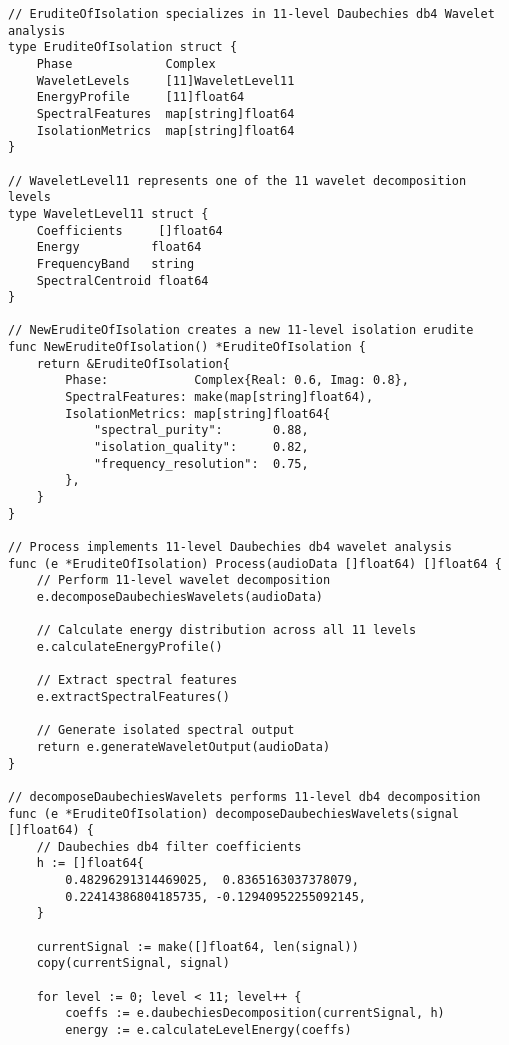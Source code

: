 \begin{tcolorbox}[colback=CodeBackground, colframe=DarkGray, title=Erudite of Isolation Implementation, fonttitle=\bfseries]
\begin{verbatim}
// EruditeOfIsolation specializes in 11-level Daubechies db4 Wavelet analysis
type EruditeOfIsolation struct {
    Phase             Complex
    WaveletLevels     [11]WaveletLevel11
    EnergyProfile     [11]float64
    SpectralFeatures  map[string]float64
    IsolationMetrics  map[string]float64
}

// WaveletLevel11 represents one of the 11 wavelet decomposition levels
type WaveletLevel11 struct {
    Coefficients     []float64
    Energy          float64
    FrequencyBand   string
    SpectralCentroid float64
}

// NewEruditeOfIsolation creates a new 11-level isolation erudite
func NewEruditeOfIsolation() *EruditeOfIsolation {
    return &EruditeOfIsolation{
        Phase:            Complex{Real: 0.6, Imag: 0.8},
        SpectralFeatures: make(map[string]float64),
        IsolationMetrics: map[string]float64{
            "spectral_purity":       0.88,
            "isolation_quality":     0.82,
            "frequency_resolution":  0.75,
        },
    }
}

// Process implements 11-level Daubechies db4 wavelet analysis
func (e *EruditeOfIsolation) Process(audioData []float64) []float64 {
    // Perform 11-level wavelet decomposition
    e.decomposeDaubechiesWavelets(audioData)
    
    // Calculate energy distribution across all 11 levels
    e.calculateEnergyProfile()
    
    // Extract spectral features
    e.extractSpectralFeatures()
    
    // Generate isolated spectral output
    return e.generateWaveletOutput(audioData)
}

// decomposeDaubechiesWavelets performs 11-level db4 decomposition
func (e *EruditeOfIsolation) decomposeDaubechiesWavelets(signal []float64) {
    // Daubechies db4 filter coefficients
    h := []float64{
        0.48296291314469025,  0.8365163037378079,
        0.22414386804185735, -0.12940952255092145,
    }
    
    currentSignal := make([]float64, len(signal))
    copy(currentSignal, signal)
    
    for level := 0; level < 11; level++ {
        coeffs := e.daubechiesDecomposition(currentSignal, h)
        energy := e.calculateLevelEnergy(coeffs)
        

\end{verbatim}
\end{tcolorbox}
